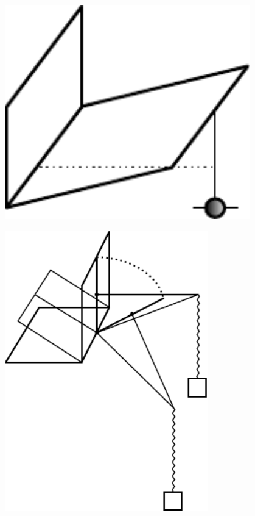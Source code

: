 \hspace{17mm}
\begin{minipage}[t][6.2cm][c]{0.25\textwidth}
\includegraphics[width=0.8\textwidth]{gesamttex/edit_VIII,3/images/LH_35_14_02_039r2_d5.pdf}
\end{minipage}
\hspace{8mm}
\begin{minipage}[t][6.2cm][c]{0.5\textwidth}
\includegraphics[width=0.66\textwidth]{gesamttex/edit_VIII,3/images/LH_35_14_02_039r2_d6.pdf}
\end{minipage}
\\
